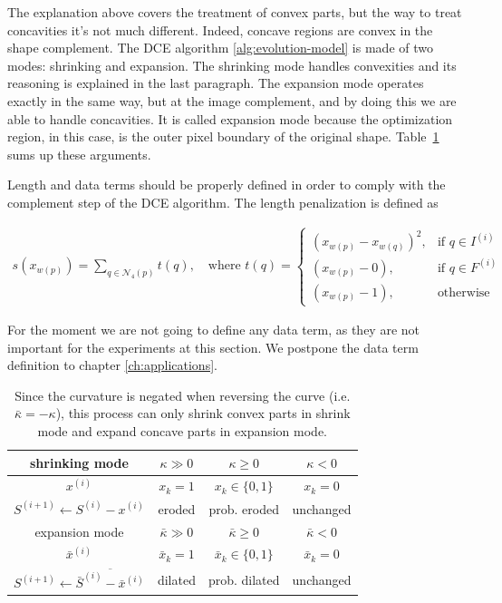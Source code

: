 The explanation above covers the treatment of convex parts, but the way to treat concavities it's not much different. Indeed, concave regions are convex in the shape complement. The DCE algorithm \ref{alg:evolution-model} is made of two modes: shrinking and expansion. The shrinking mode handles convexities and its reasoning is explained in the last paragraph. The expansion mode operates exactly in the same way, but at the image complement, and by doing this we are able to handle
concavities. It is called expansion mode because the optimization region, in this case, is the outer pixel boundary of
the original shape. Table~\ref{tab:flow-summary} sums up these arguments.

Length and data terms should be properly defined in order to comply with the complement step of the DCE
algorithm. The length penalization is defined as

\begin{align}
  s(x_{w(p)})=\sum_{q \in \mathcal{N}_4(p)}{ t(q) }, \quad \text{where } t(q) = \left\{\begin{array}{ll}
  (x_{w(p)}-x_{w(q)})^2, & \text{if } q \in I^{(i)}\\
  (x_{w(p)}-0), & \text{if } q \in F^{(i)}\\
  (x_{w(p)}-1), & \text{otherwise }
  \end{array}\right.
  \label{eq:length-penalization}
\end{align}
	
For the moment we are not going to define any data term, as they are not important for the experiments at this section. We postpone the data term definition to chapter \ref{ch:applications}.



\begin{table}
  \center
  \setlength{\extrarowheight}{0.5em}
  \begin{tabular}{|c|c|c|c|} \hline
    shrinking mode &    $\kappa \gg 0$ & $\kappa \geq 0$ &  $\kappa < 0$ \\ \hline
    $x^{(i)}$ & $x_k=1$ & $x_k \in \{0,1\}$ & $x_k=0$ \\ \hline
    $S^{(i+1)} \leftarrow S^{(i)} - x^{(i)}$ & eroded & prob. eroded & unchanged  \\ \hline \hline
    expansion mode &    $\bar{\kappa} \gg 0$ & $\bar{\kappa} \geq 0$ & $\bar{\kappa} < 0$ \\ \hline
    $\bar{x}^{(i)}$ & $\bar{x}_k=1$ & $\bar{x}_k \in \{0,1\}$ & $\bar{x}_k=0$ \\ \hline
    $S^{(i+1)} \leftarrow \overline{\bar{S}^{(i)} - \bar{x}^{(i)}}$ & dilated & prob. dilated & unchanged \\ \hline 
  \end{tabular}
  
  \caption{  Since the curvature is negated when reversing the curve (i.e. $\bar{\kappa}=-\kappa$), this process can only shrink  convex parts in shrink mode and expand concave parts in expansion mode.}
   \label{tab:flow-summary}	  

\end{table}


